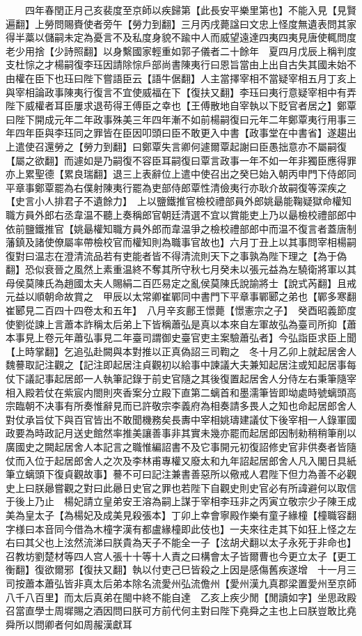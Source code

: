 　　四年春閏正月己亥裴度至京師以疾歸第【此長安平樂里第也】不能入見【見賢遍翻】上勞問賜賚使者旁午【勞力到翻】三月丙戌薨諡曰文忠上怪度無遺表問其家得半藁以儲嗣未定為憂言不及私度身貌不踰中人而威望遠達四夷四夷見唐使輒問度老少用捨【少詩照翻】以身繫國家輕重如郭子儀者二十餘年　夏四月戊辰上稱判度支杜悰之才楊嗣復李珏因請除悰戶部尚書陳夷行曰恩旨當由上出自古失其國未始不由權在臣下也珏曰陛下嘗語臣云【語牛倨翻】人主當擇宰相不當疑宰相五月丁亥上與宰相論政事陳夷行復言不宜使威福在下【復扶又翻】李珏曰夷行意疑宰相中有弄陛下威權者耳臣屢求退苟得王傅臣之幸也【王傅散地自宰執以下貶官者居之】鄭覃曰陛下開成元年二年政事殊美三年四年漸不如前楊嗣復曰元年二年鄭覃夷行用事三年四年臣與李珏同之罪皆在臣因叩頭曰臣不敢更入中書【政事堂在中書省】遂趨出上遣使召還勞之【勞力到翻】曰鄭覃失言卿何遽爾覃起謝曰臣愚拙意亦不屬嗣復【屬之欲翻】而遽如是乃嗣復不容臣耳嗣復曰覃言政事一年不如一年非獨臣應得罪亦上累聖德【累良瑞翻】退三上表辭位上遣中使召出之癸巳始入朝丙申門下侍郎同平章事鄭覃罷為右僕射陳夷行罷為吏部侍郎覃性清儉夷行亦耿介故嗣復等深疾之【史言小人排君子不遺餘力】　上以鹽鐵推官檢校禮部員外郎姚朂能鞠疑獄命權知職方員外郎右丞韋温不聽上奏稱郎官朝廷清選不宜以賞能吏上乃以朂檢校禮部郎中依前鹽鐵推官【姚朂權知職方員外郎而韋温爭之檢校禮部郎中而温不復言者蓋唐制藩鎮及諸使僚屬率帶檢校官而權知則為職事官故也】六月丁丑上以其事問宰相楊嗣復對曰温志在澄清流品若有吏能者皆不得清流則天下之事孰為陛下理之【為于偽翻】恐似衰晉之風然上素重温終不奪其所守秋七月癸未以張元益為左驍衛將軍以其母侯莫陳氏為趙國太夫人賜絹二百匹易定之亂侯莫陳氏說諭將士【說式芮翻】且戒元益以順朝命故賞之　甲辰以太常卿崔鄲同中書門下平章事鄲郾之弟也【鄲多寒翻崔郾見二百四十四卷太和五年】　八月辛亥鄜王憬薨【憬憲宗之子】　癸酉昭義節度使劉從諫上言蕭本詐稱太后弟上下皆稱蕭弘是真以本來自左軍故弘為臺司所抑【蕭本事見上卷元年蕭弘事見二年臺司謂御史臺官吏主案驗蕭弘者】今弘詣臣求臣上聞【上時掌翻】乞追弘赴闕與本對推以正真偽詔三司鞫之　冬十月乙卯上就起居舍人魏謩取記注觀之【記注即起居注貞觀初以給事中諫議大夫兼知起居注或知起居事每仗下議記事起居郎一人執筆記錄于前史官隨之其後復置起居舍人分侍左右秉筆隨宰相入殿若仗在紫宸内閤則夾香案分立殿下直第二螭首和墨濡筆皆即坳處時號螭頭高宗臨朝不决事有所奏惟辭見而已許敬宗李義府為相奏請多畏人之知也命起居郎舍人對仗承旨仗下與百官皆出不敢聞機務矣長夀中宰相姚璹建議仗下後宰相一人錄軍國政要為時政記月送史館然率推美讓善事非其實未幾亦罷而起居郎因制勑稍稍筆削以廣國史之闕起居舍人本記言之職惟編詔書不及它事開元初復詔修史官非供奏者皆隨仗而入位于起居郎舍人之次及李林甫專權又廢太和九年詔起居郎舍人凡入閣日具紙筆立螭頭下復貞觀故事】謩不可曰記注兼書善惡所以儆戒人君陛下但力為善不必觀史上曰朕曏嘗觀之對曰此曏日史官之罪也若陛下自觀史則史官必有所諱避何以取信于後上乃止　楊妃請立皇弟安王溶為嗣上謀于宰相李珏非之丙寅立敬宗少子陳王成美為皇太子【為楊妃及成美見殺張本】丁卯上幸會寧殿作樂有童子緣橦【橦職容翻字様曰本音同今借為木橦字漢有都盧緣橦即此伎也】一夫來往走其下如狂上怪之左右曰其父也上泫然流涕曰朕貴為天子不能全一子【泫胡犬翻以太子永死于非命也】召教坊劉楚材等四人宫人張十十等十人責之曰構會太子皆爾曹也今更立太子【更工衡翻】復欲爾邪【復扶又翻】執以付吏己巳皆殺之上因是感傷舊疾遂增　十一月三司按蕭本蕭弘皆非真太后弟本除名流愛州弘流儋州【愛州漢九真郡梁置愛州至京師八千八百里】而太后真弟在閩中終不能自達　乙亥上疾少閒【閒讀如字】坐思政殿召當直學士周墀賜之酒因問曰朕可方前代何主對曰陛下堯舜之主也上曰朕豈敢比堯舜所以問卿者何如周赧漢獻耳